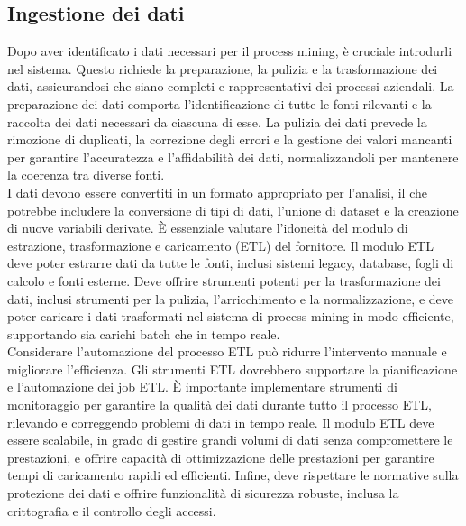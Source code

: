 \documentclass{article}
\begin{document}
\subsection{Ingestione dei dati}
Dopo aver identificato i dati necessari per il process mining, è cruciale introdurli nel sistema. Questo richiede la preparazione, la pulizia e la trasformazione dei dati, assicurandosi che siano completi e rappresentativi dei processi aziendali. La preparazione dei dati comporta l'identificazione di tutte le fonti rilevanti e la raccolta dei dati necessari da ciascuna di esse. La pulizia dei dati prevede la rimozione di duplicati, la correzione degli errori e la gestione dei valori mancanti per garantire l'accuratezza e l'affidabilità dei dati, normalizzandoli per mantenere la coerenza tra diverse fonti.\\
I dati devono essere convertiti in un formato appropriato per l'analisi, il che potrebbe includere la conversione di tipi di dati, l'unione di dataset e la creazione di nuove variabili derivate. È essenziale valutare l'idoneità del modulo di estrazione, trasformazione e caricamento (ETL) del fornitore. Il modulo ETL deve poter estrarre dati da tutte le fonti, inclusi sistemi legacy, database, fogli di calcolo e fonti esterne. Deve offrire strumenti potenti per la trasformazione dei dati, inclusi strumenti per la pulizia, l'arricchimento e la normalizzazione, e deve poter caricare i dati trasformati nel sistema di process mining in modo efficiente, supportando sia carichi batch che in tempo reale.\\
Considerare l'automazione del processo ETL può ridurre l'intervento manuale e migliorare l'efficienza. Gli strumenti ETL dovrebbero supportare la pianificazione e l'automazione dei job ETL. È importante implementare strumenti di monitoraggio per garantire la qualità dei dati durante tutto il processo ETL, rilevando e correggendo problemi di dati in tempo reale. Il modulo ETL deve essere scalabile, in grado di gestire grandi volumi di dati senza compromettere le prestazioni, e offrire capacità di ottimizzazione delle prestazioni per garantire tempi di caricamento rapidi ed efficienti. Infine, deve rispettare le normative sulla protezione dei dati e offrire funzionalità di sicurezza robuste, inclusa la crittografia e il controllo degli accessi.
\end{document}
